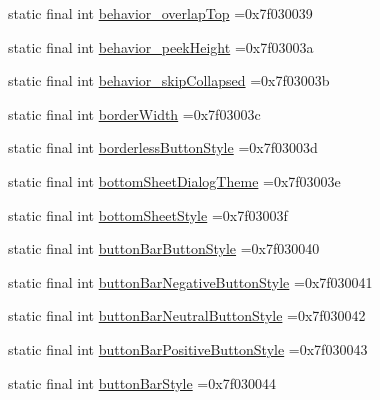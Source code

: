 \begin{DoxyCompactItemize}
static final int \mbox{\hyperlink{classbr_1_1unb_1_1cic_1_1mp_1_1marketmaster_1_1test_1_1R_1_1attr_a09b80869bda6b222315524e238c6e061}{behavior\+\_\+overlap\+Top}} =0x7f030039
\item 
static final int \mbox{\hyperlink{classbr_1_1unb_1_1cic_1_1mp_1_1marketmaster_1_1test_1_1R_1_1attr_a1ff7f03b16a0436d98322214917b43dc}{behavior\+\_\+peek\+Height}} =0x7f03003a
\item 
static final int \mbox{\hyperlink{classbr_1_1unb_1_1cic_1_1mp_1_1marketmaster_1_1test_1_1R_1_1attr_ac39409aa69a89c4f6b19abdc7de19b49}{behavior\+\_\+skip\+Collapsed}} =0x7f03003b
\item 
static final int \mbox{\hyperlink{classbr_1_1unb_1_1cic_1_1mp_1_1marketmaster_1_1test_1_1R_1_1attr_abec7957cbbec0337bd60280a5b916dcc}{border\+Width}} =0x7f03003c
\item 
static final int \mbox{\hyperlink{classbr_1_1unb_1_1cic_1_1mp_1_1marketmaster_1_1test_1_1R_1_1attr_a32bbfc4f787c707ab38d63af3b7045ae}{borderless\+Button\+Style}} =0x7f03003d
\item 
static final int \mbox{\hyperlink{classbr_1_1unb_1_1cic_1_1mp_1_1marketmaster_1_1test_1_1R_1_1attr_abf230fe21e231e6135f3995dde267bd2}{bottom\+Sheet\+Dialog\+Theme}} =0x7f03003e
\item 
static final int \mbox{\hyperlink{classbr_1_1unb_1_1cic_1_1mp_1_1marketmaster_1_1test_1_1R_1_1attr_a5b4f8143998c6458d022008a59ba70f1}{bottom\+Sheet\+Style}} =0x7f03003f
\item 
static final int \mbox{\hyperlink{classbr_1_1unb_1_1cic_1_1mp_1_1marketmaster_1_1test_1_1R_1_1attr_a019fc5a8b7aaf0b034c562947e966556}{button\+Bar\+Button\+Style}} =0x7f030040
\item 
static final int \mbox{\hyperlink{classbr_1_1unb_1_1cic_1_1mp_1_1marketmaster_1_1test_1_1R_1_1attr_a278a82ad25ebcd8899bc6f0c44b7a32f}{button\+Bar\+Negative\+Button\+Style}} =0x7f030041
\item 
static final int \mbox{\hyperlink{classbr_1_1unb_1_1cic_1_1mp_1_1marketmaster_1_1test_1_1R_1_1attr_af3541d5e8847bee9955dc1a23fa64889}{button\+Bar\+Neutral\+Button\+Style}} =0x7f030042
\item 
static final int \mbox{\hyperlink{classbr_1_1unb_1_1cic_1_1mp_1_1marketmaster_1_1test_1_1R_1_1attr_a9ad085ecebe5364319a34f5808b2785b}{button\+Bar\+Positive\+Button\+Style}} =0x7f030043
\item 
static final int \mbox{\hyperlink{classbr_1_1unb_1_1cic_1_1mp_1_1marketmaster_1_1test_1_1R_1_1attr_a217283dff0831081e62770e52ced13c3}{button\+Bar\+Style}} =0x7f030044

\end{DoxyCompactItemize}
